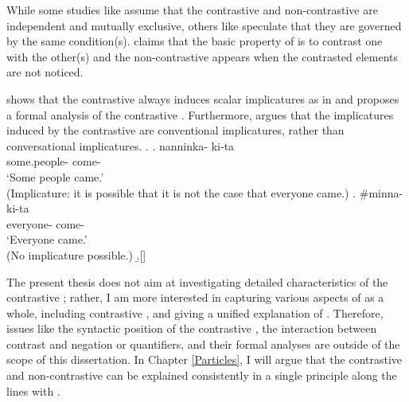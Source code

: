 While some studies like  assume that
the contrastive  and non-contrastive  are independent and mutually exclusive,
others like  speculate that
they are governed by the same condition(s).
claims that the basic property of  is to contrast one with the other(s) and
the non-contrastive  appears when the contrasted elements are not noticed.



shows that the contrastive  always induces scalar implicatures as in \Next[a] and
proposes a formal analysis of the contrastive .
Furthermore,
 argues that the implicatures induced by the contrastive 
are conventional implicatures, rather than conversational implicatures.
%
\ex.
 \ag. nanninka- ki-ta \\
      some.people- come- \\
      `Some people came.'\\
      (Implicature: it is possible that it is not the case that
      everyone came.)
  \bg. \#minna- ki-ta \\
        everyone- come- \\
        `Everyone came.'\\
        (No implicature possible.)
  \b.[] \hfill{\cite[p.~36]{hara06}}


The present thesis does not aim at investigating detailed characteristics of
the contrastive ;
rather, I am more interested in capturing various aspects of  as a whole,
including contrastive ,
and giving a unified explanation of .
Therefore, issues like the syntactic position of the contrastive ,
the interaction between contrast and negation or quantifiers,
and their formal analyses
are outside of the scope of this dissertation.
In Chapter \ref{Particles},
I will argue that the contrastive and non-contrastive  can be explained consistently in a single principle
along the lines with .

